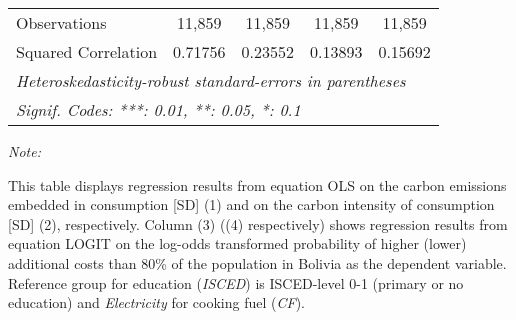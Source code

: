 \begin{table}[htbp!]
\begin{adjustbox}{width = 1\textwidth, max height = 0.95\textheight, center}
\begin{threeparttable}[b]
\begin{tabular}{lcccc}
            Observations         & 11,859             & 11,859             & 11,859        & 11,859\\  
            Squared Correlation  & 0.71756            & 0.23552            & 0.13893       & 0.15692\\  
            \midrule \midrule
            \multicolumn{5}{l}{\emph{Heteroskedasticity-robust standard-errors in parentheses}}\\
            \multicolumn{5}{l}{\emph{Signif. Codes: ***: 0.01, **: 0.05, *: 0.1}}\\
         \end{tabular}
         
         \begin{tablenotes}\item \medskip \textit{Note:}
            \item This table displays regression results from equation OLS on the carbon emissions embedded in consumption [SD] (1) and on the carbon intensity of consumption [SD] (2), respectively. 
                                      Column (3) ((4) respectively) shows regression results from equation LOGIT on the log-odds transformed probability of higher (lower) additional costs than 80\% of the population in Bolivia as the dependent variable. Reference group for education (\textit{ISCED}) is ISCED-level 0-1 (primary or no education) and \textit{Electricity} for cooking fuel (\textit{CF}).
         \end{tablenotes}
      \end{threeparttable}
   \end{adjustbox}
\end{table}


